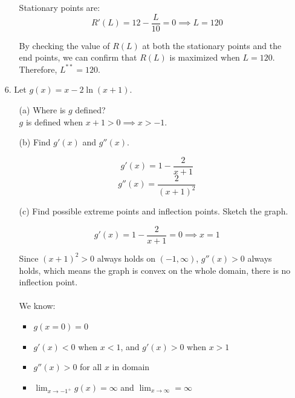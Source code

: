 \documentclass{article}
\begin{document}
\begin{enumerate}
\begin{enumerate}
            Stationary points are:
            $$  R'(L) = 12 - \frac{L}{10} = 0 \implies L = 120 $$
            
            By checking the value of $R(L)$ at both the stationary points and the end points, we can confirm that $R(L)$ is maximized when $L=120$. \\
            
            Therefore, $ L^{**} = 120 $. \\
            
        \end{enumerate}
    
    
    \item[6.] Let $g(x) = x - 2\ln{(x+1)}$.
        \begin{enumerate}
            \item[(a)] Where is $g$ defined? \\
            
            $g$ is defined when $x+1>0 \implies x>-1$. \\
            
            \item[(b)] Find $g'(x)$ and $g''(x)$.
            
            $$ g'(x) = 1 - \frac{2}{x+1} $$
            $$ g''(x) = \frac{2}{(x+1)^2} $$
            
            \item[(c)] Find possible extreme points and inflection points. Sketch the graph.
            
            $$ g'(x) = 1 - \frac{2}{x+1} = 0 \implies x = 1 $$
            
            Since  $(x+1)^2>0$ always holds on $(-1,\infty)$, $g''(x)>0$ always holds, which means the graph is convex on the whole domain, there is no inflection point. \\\\
            
            We know:
            
            \begin{itemize}
                \item $g(x=0)=0$
                \item $g'(x)<0$ when $x<1$, and $g'(x)>0$ when $x>1$
                \item $g''(x)>0$ for all $x$ in domain
                \item $\lim_{x \rightarrow -1^{+}}{g(x)} = \infty$ and $\lim_{x \rightarrow \infty} = \infty$
            \end{itemize}
            

\end{enumerate}
\end{enumerate}
\end{document}
